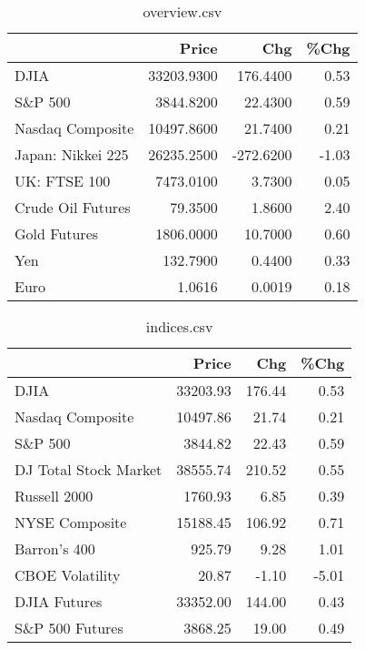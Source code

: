 \documentclass{article}%
\begin{document}
\begin{table}[htbp]%
\caption{overview.csv}%
\centering%
\begin{adjustbox}{width=1\textwidth}%
\begin{tabular}{lrrr}
\toprule
                  &      Price &       Chg &  \%Chg \\
\midrule
             DJIA & 33203.9300 &  176.4400 &  0.53 \\
          S\&P 500 &  3844.8200 &   22.4300 &  0.59 \\
 Nasdaq Composite & 10497.8600 &   21.7400 &  0.21 \\
Japan: Nikkei 225 & 26235.2500 & -272.6200 & -1.03 \\
     UK: FTSE 100 &  7473.0100 &    3.7300 &  0.05 \\
Crude Oil Futures &    79.3500 &    1.8600 &  2.40 \\
     Gold Futures &  1806.0000 &   10.7000 &  0.60 \\
              Yen &   132.7900 &    0.4400 &  0.33 \\
             Euro &     1.0616 &    0.0019 &  0.18 \\
\bottomrule
\end{tabular}
%
\end{adjustbox}%
\end{table}

%


\begin{table}[htbp]%
\caption{indices.csv}%
\centering%
\begin{adjustbox}{width=1\textwidth}%
\begin{tabular}{lrrr}
\toprule
                      &    Price &    Chg &  \%Chg \\
\midrule
                 DJIA & 33203.93 & 176.44 &  0.53 \\
     Nasdaq Composite & 10497.86 &  21.74 &  0.21 \\
              S\&P 500 &  3844.82 &  22.43 &  0.59 \\
DJ Total Stock Market & 38555.74 & 210.52 &  0.55 \\
         Russell 2000 &  1760.93 &   6.85 &  0.39 \\
       NYSE Composite & 15188.45 & 106.92 &  0.71 \\
         Barron's 400 &   925.79 &   9.28 &  1.01 \\
      CBOE Volatility &    20.87 &  -1.10 & -5.01 \\
         DJIA Futures & 33352.00 & 144.00 &  0.43 \\
      S\&P 500 Futures &  3868.25 &  19.00 &  0.49 \\
\bottomrule
\end{tabular}
%
\end{adjustbox}%
\end{table}
\end{document}

